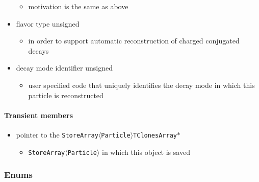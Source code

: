 \begin{itemize}
\begin{itemize}
  \item motivation is the same as above
 \end{itemize}
 \item {\color{blue}flavor type} \hfill{unsigned}
 \begin{itemize}
  \item in order to support automatic reconstruction of charged conjugated decays
 \end{itemize}
 \item {\color{blue}decay mode identifier} \hfill{unsigned}
 \begin{itemize}
  \item user specified code that uniquely identifies the decay mode in which this particle is reconstructed
 \end{itemize}
\end{itemize}

\paragraph{Transient members}

\begin{itemize}
 \item {\color{blue} pointer to the {\tt StoreArray$\langle$Particle$\rangle$}}\hfill{\tt TClonesArray$\ast$}
 \begin{itemize}
  \item  {\tt StoreArray$\langle$Particle$\rangle$} in which this \particle object is saved
 \end{itemize}
\end{itemize}

\subsubsection{Enums}

